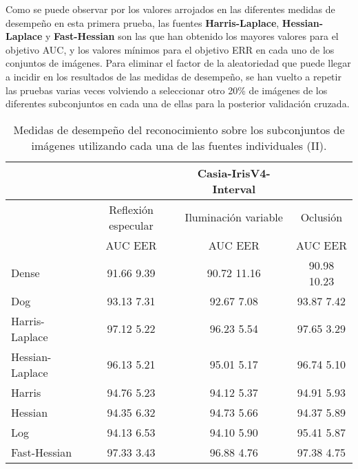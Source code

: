 Como se puede observar por los valores arrojados en las diferentes medidas de desempeño en esta primera prueba, las fuentes \textbf{Harris-Laplace}, \textbf{Hessian-Laplace} y \textbf{Fast-Hessian} son las que han obtenido los mayores valores para el objetivo AUC, y los valores mínimos para el objetivo ERR en cada uno de los conjuntos de imágenes. Para eliminar el factor de la aleatoriedad que puede llegar a incidir en los resultados de las medidas de desempeño, se han vuelto a repetir las pruebas varias veces volviendo a seleccionar otro 20\% de imágenes de los diferentes subconjuntos en cada una de ellas para la posterior validación cruzada. \\ 


\begin{table}[h]
\begin{center}
\begin{tabular}{@{}lccc@{}}
\toprule
&& Casia-IrisV4-Interval & \\ \hline
&Reflexión especular		&  	Iluminación variable		& Oclusión \\ \hline
&AUC  \phantom{aa} EER  &  	AUC  \phantom{aa} EER 	& AUC  \phantom{aa} EER  \\ \hline
Dense& 91.66 \phantom{aa} 9.39   &  	90.72 \phantom{aa} 11.16  & 90.98 \phantom{aa} 10.23  \\
Dog& 93.13 \phantom{aa} 7.31   &  	92.67 \phantom{aa} 7.08  & 93.87 \phantom{aa} 7.42  \\
Harris-Laplace& 97.12 \phantom{aa} 5.22   &  	96.23 \phantom{aa} 5.54  & 97.65 \phantom{aa} 3.29  \\
Hessian-Laplace& 96.13 \phantom{aa} 5.21   &  95.01 \phantom{aa} 5.17 & 96.74 \phantom{aa} 5.10  \\
Harris& 94.76  \phantom{aa}5.23  &  	94.12 \phantom{aa} 5.37  & 94.91  \phantom{aa}5.93  \\
Hessian& 94.35 \phantom{aa} 6.32   &  94.73 \phantom{aa} 5.66  & 94.37 \phantom{aa} 5.89  \\
Log& 94.13 \phantom{aa} 6.53  &  94.10  \phantom{aa}5.90 & 95.41 \phantom{aa} 5.87   \\ 
Fast-Hessian& 97.33 \phantom{aa} 3.43   &  	96.88 \phantom{aa} 4.76  & 97.38 \phantom{aa} 4.75  \\

\end{tabular}
\end{center}
\caption{Medidas de desempeño del reconocimiento sobre los subconjuntos de imágenes utilizando cada una de las fuentes individuales (II).}
\label{my_tabla}
\end{table}



